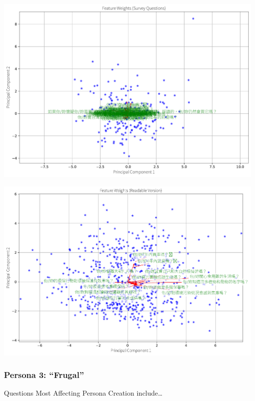 \documentclass[
  letterpaper,
  DIV=11,
  numbers=noendperiod]{scrartcl}
\begin{document}
\includegraphics{_thesis_files/figure-pdf/cell-26-output-3.pdf}

\includegraphics{_thesis_files/figure-pdf/cell-26-output-4.pdf}

\subsubsection{Persona 3: ``Frugal''}\label{persona-3-frugal}

Questions Most Affecting Persona Creation include\ldots{}
\end{document}
